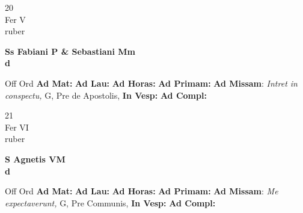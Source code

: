\documentclass[10pt, openany]{book}
\begin{document}
    \begin{center}
        \begin{minipage}{3.5in}
            \vspace{2em}
            \begin{minipage}{0.5in}
                {\Huge 20} \\
                {\normalsize Fer V} \\
                {\normalsize ruber}
            \end{minipage}
            \begin{minipage}{3.0in}
                \textbf{ \large Ss Fabiani P \& Sebastiani Mm \\
                \textnormal{\normalsize d}} \\ 
            \end{minipage}
            \begin{justify}Off Ord
                \textbf{Ad Mat: }
                \textbf{Ad Lau: }
                \textbf{Ad Horas: }
                \textbf{Ad Primam: }\textbf{Ad Missam}: \textit{Intret in conspectu,} G, Pre de Apostolis,  
                \textbf{In Vesp: }
                \textbf{Ad Compl: }
            \end{justify}
        \end{minipage}
    \end{center}

    \begin{center}
        \begin{minipage}{3.5in}
            \vspace{2em}
            \begin{minipage}{0.5in}
                {\Huge 21} \\
                {\normalsize Fer VI} \\
                {\normalsize ruber}
            \end{minipage}
            \begin{minipage}{3.0in}
                \textbf{ \large S Agnetis VM \\
                \textnormal{\normalsize d}} \\ 
            \end{minipage}
            \begin{justify}Off Ord
                \textbf{Ad Mat: }
                \textbf{Ad Lau: }
                \textbf{Ad Horas: }
                \textbf{Ad Primam: }\textbf{Ad Missam}: \textit{Me expectaverunt,} G, Pre Communis,  
                \textbf{In Vesp: }
                \textbf{Ad Compl: }
            \end{justify}
        \end{minipage}
    \end{center}
\end{document}
